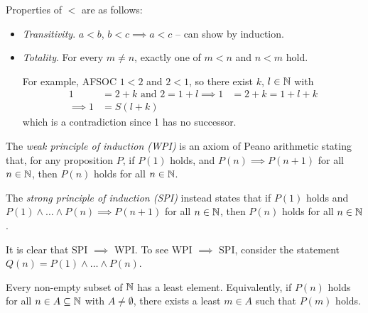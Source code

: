 \documentclass{../../template/note}
\begin{document}
    Properties of \(<\) are as follows:

    \begin{itemize}
        \item \emph{Transitivity}. \(a < b\), \(b < c \implies a < c\) -- can show by induction.
        \item \emph{Totality}. For every \(m \neq n\), exactly one of \(m < n\) and \(n < m\) hold.
        
        For example, AFSOC \(1 < 2\) and \(2 < 1\), so there exist \(k\), \(l \in \mathbb N\) with
        \begin{align*}
            1 &= 2 + k \text{ and } 2 = 1 + l
            \implies 1 &= 2 + k = 1 + l + k \\
            \implies 1 &= S(l + k)
        \end{align*}
        which is a contradiction since 1 has no successor.
        
    \end{itemize}
    
    \begin{definition}
        The \emph{weak principle of induction (WPI)} is an axiom of Peano arithmetic stating that, for any proposition \(P\), if \(P(1)\) holds, and \(P(n) \implies P(n+1)\) for all \(n \in \mathbb N\), then \(P(n)\) holds for all \(n \in \mathbb N\).
    \end{definition}
    
    \begin{definition}
        The \emph{strong principle of induction (SPI)} instead states that if \(P(1)\) holds and \(P(1) \wedge \dots \wedge P(n) \implies P(n+1)\) for all \(n \in \mathbb N\), then \(P(n)\) holds for all \(n \in \mathbb N\).
    \end{definition}
    
    \begin{remark*}
        It is clear that SPI \(\implies\) WPI. To see WPI \(\implies\) SPI, consider the statement \(Q(n) = P(1) \wedge \dots \wedge P(n)\).
    \end{remark*}
    
    \begin{definition}
        Every non-empty subset of \(\mathbb N\) has a least element. Equivalently, if \(P(n)\) holds for all \(n \in A \subseteq \mathbb N\) with \(A \neq \emptyset\), there exists a least \(m \in A\) such that \(P(m)\) holds.
    \end{definition}
    
\end{document}

